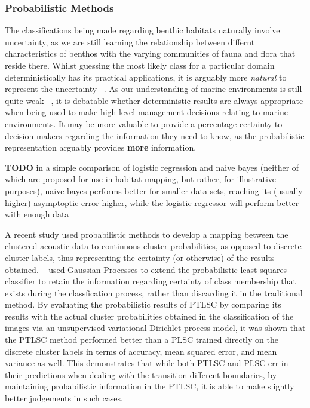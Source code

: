 \documentclass[12pt]{article}
\begin{document}
            \subsubsection{Probabilistic Methods}
            The classifications being made regarding benthic habitats naturally involve uncertainty, as we are still learning the relationship between differnt characteristics of benthos with the varying communities of fauna and flora that reside there. Whilst guessing the most likely class for a particular domain deterministically has its practical applications, it is arguably more \textit{natural} to represent the uncertainty ~\citep{rasmussen06}. As our understanding of marine environments is still quite weak ~\citep{un04}, it is debatable whether deterministic results are always appropriate when being used to make high level management decisions relating to marine environments. It may be more valuable to provide a percentage certainty to decision-makers regarding the information they need to know, as the probabilistic representation arguably provides \textbf{more} information.

            \textbf{TODO} in a simple comparison of logistic regression and naive bayes (neither of which are proposed for use in habitat mapping, but rather, for illustrative purposes), naive bayes performs better for smaller data sets, reaching its (usually higher) asymptoptic error higher, while the logistic regressor will perform better with enough data ~\citep{ng04}

            A recent study used probabilistic methods to develop a mapping between the clustered acoustic data to continuous cluster probabilities, as opposed to discrete cluster labels, thus representing the certainty (or otherwise) of the results obtained. ~\citet*{bender12} used Gaussian Processes to extend the probabilistic least squares classifier to retain the information regarding certainty of class membership that exists during the classfication process, rather than discarding it in the traditional method. By evaluating the probabilistic results of PTLSC by comparing its results with the actual cluster probabilities obtained in the classification of the images via an unsupervised variational Dirichlet process model, it was shown that the PTLSC method performed better than a PLSC trained directly on the discrete cluster labels in terms of accuracy, mean squared error, and mean variance as well. This demonstrates that while both PTLSC and PLSC err in their predictions when dealing with the transition different boundaries, by maintaining probabilistic information in the PTLSC, it is able to make slightly better judgements in such cases.
\end{document}
